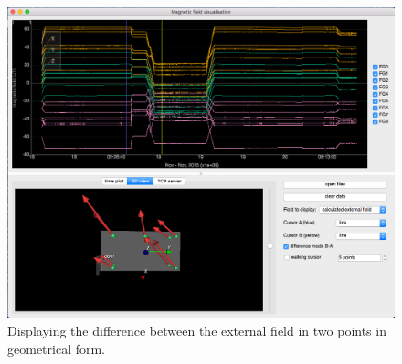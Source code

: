 

\begin{figure}
  \centering
  \includegraphics[width=0.8\linewidth]{gfx/nEDM_SFC/visualisation/visualisation4.png}
  \caption{Displaying the difference between the external field in two points in geometrical form.}\label{fig:nEDM_SFC_visualisation4}
\end{figure}

